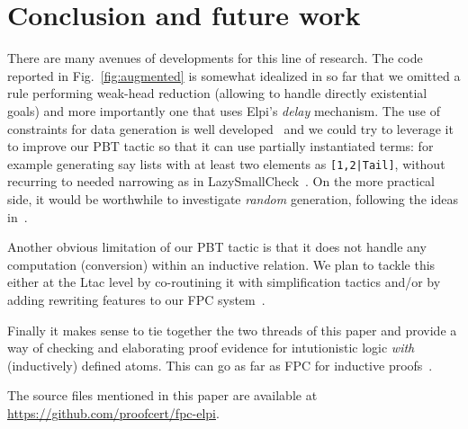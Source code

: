 \section{Conclusion and future work}


There are many avenues of developments for this line of research.
The code reported in Fig.~\ref{fig:augmented} is somewhat idealized in
so far that we omitted a rule performing weak-head reduction (allowing
to handle directly existential goals) and more importantly one that uses
 Elpi's \emph{delay} mechanism. %
The
use of constraints for data generation is well
developed~\cite{FioravantiPS15} and we could try to leverage it to
improve our PBT tactic so that it can use partially instantiated terms: for example generating
say lists with at least two elements as \texttt{[1,2|Tail]}, without
recurring to needed narrowing as in 
LazySmallCheck~\cite{smallcheck}. On the more practical side, it would be worthwhile to investigate \emph{random} generation, following the ideas in~\cite{pltredexconstraintlogic,blanco19ppdp}.

Another obvious limitation of our PBT tactic is that it does not 
 handle any computation (conversion) within an inductive relation. We plan to tackle this either at the Ltac level by co-routining it with simplification tactics and/or by adding rewriting features to our FPC system~\cite{ChihaniM16}.

 Finally it makes sense to tie together the two threads of this paper
 and provide a way of checking and elaborating proof evidence for
 intutionistic logic \emph{with} (inductively) defined atoms. This
 can go as far as FPC for inductive proofs~\cite{blanco15wof}.

 \smallskip
 The source files mentioned in this paper are available at \url{https://github.com/proofcert/fpc-elpi}.



